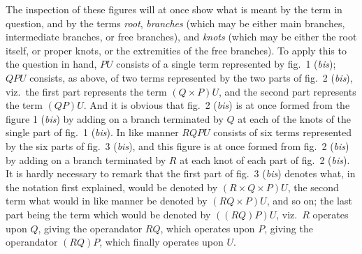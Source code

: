 \documentclass[12pt,a4paper]{article}
\theoremstyle{plain}
\begin{document}
The inspection of these figures will at once show what is meant by the term in question, and by the terms \textit{root}, \textit{branches} (which may be either main branches, intermediate branches, or free branches), and \textit{knots} (which may be either the root itself, or proper knots, or the extremities of the free branches). To apply this to the question in hand, $PU$ consists of a single term represented by fig.~1 (\textit{bis}); $QPU$ consists, as above, of two terms represented by the two parts of fig.~2 (\textit{bis}), viz.\ the first part represents the term $(Q\times P)U$, and the second part represents the term $(QP)U$. And it is obvious that fig.~2 (\textit{bis}) is at once formed from the figure 1 (\textit{bis}) by adding on a branch terminated by $Q$ at each of the knots of the single part of fig.~1 (\textit{bis}). In like manner $RQPU$ consists of six terms represented by the six parts of fig.~3 (\textit{bis}), and this figure is at once formed from fig.~2 (\textit{bis}) by adding on a branch terminated by $R$ at each knot of each part of fig.~2 (\textit{bis}). It is hardly necessary to remark that the first part of fig.~3 (\textit{bis}) denotes what, in the notation first explained, would be denoted by $(R\times Q\times P)U$, the second term what would in like manner be denoted by $(RQ\times P)U$, and so on; the last part being the term which would be denoted by $((RQ)P)U$, viz.\ $R$ operates upon $Q$, giving the operandator $RQ$, which operates upon $P$, giving the operandator $(RQ)P$, which finally operates upon $U$.

\medskip
\end{document}
